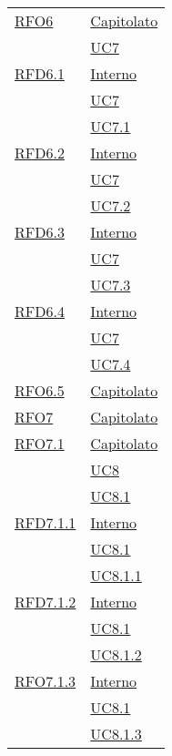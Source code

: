 \begin{longtable}{|>{\centering}m{5cm}|m{5cm}<{\centering}|}
\hyperlink{RFO6}{RFO6} & \hyperlink{Capitolato}{Capitolato}\\
& \hyperref[UC7]{UC7}\\ \hline

\hyperlink{RFD6.1}{RFD6.1} & \hyperlink{Interno}{Interno}\\
& \hyperref[UC7]{UC7}\\
& \hyperref[UC7.1]{UC7.1}\\ \hline

\hyperlink{RFD6.2}{RFD6.2} & \hyperlink{Interno}{Interno}\\
& \hyperref[UC7]{UC7}\\
& \hyperref[UC7.2]{UC7.2}\\ \hline

\hyperlink{RFD6.3}{RFD6.3} & \hyperlink{Interno}{Interno}\\
& \hyperref[UC7]{UC7}\\
& \hyperref[UC7.3]{UC7.3}\\ \hline

\hyperlink{RFD6.4}{RFD6.4} & \hyperlink{Interno}{Interno}\\
& \hyperref[UC7]{UC7}\\
& \hyperref[UC7.4]{UC7.4}\\ \hline

\hyperlink{RFO6.5}{RFO6.5} & \hyperlink{Capitolato}{Capitolato}\\ \hline

\hyperlink{RFO7}{RFO7} & \hyperlink{Capitolato}{Capitolato}\\ \hline

\hyperlink{RFO7.1}{RFO7.1} & \hyperlink{Capitolato}{Capitolato}\\
& \hyperref[UC8]{UC8}\\
& \hyperref[UC8.1]{UC8.1}\\ \hline

\hyperlink{RFD7.1.1}{RFD7.1.1} & \hyperlink{Interno}{Interno}\\
& \hyperref[UC8.1]{UC8.1}\\
& \hyperref[UC8.1.1]{UC8.1.1}\\ \hline

\hyperlink{RFD7.1.2}{RFD7.1.2} & \hyperlink{Interno}{Interno}\\
& \hyperref[UC8.1]{UC8.1}\\
& \hyperref[UC8.1.2]{UC8.1.2}\\ \hline

\hyperlink{RFO7.1.3}{RFO7.1.3} & \hyperlink{Interno}{Interno}\\
& \hyperref[UC8.1]{UC8.1}\\
& \hyperref[UC8.1.3]{UC8.1.3}\\ \hline


\end{longtable}
